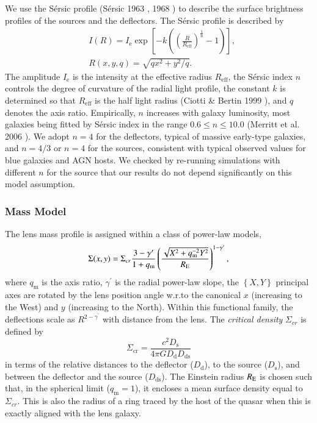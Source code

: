 \documentclass[a4paper,11pt]{article}
\def\qm{q_\mathrm{m}}
\begin{document}
We use the S\'ersic profile (S{\'e}rsic 1963 \cite{1963BAAA....6...41S}, 1968 \cite{1968adga.book.....S})
to describe the surface brightness profiles of the sources and the deflectors. The
S\'ersic profile is described by %
%
\begin{eqnarray}
   \label{eq:Intensity}
   &I(R) = I_{\mathrm{e}} \exp\left[-k\left(\left(\frac{R}{R_{\mathrm{eff}}}\right)^{\frac{1}{\mathrm{n}}}-1\right)\right] ,\\
   &R(x,y,q) = \sqrt{qx^2+y^2/q}.
\end{eqnarray}
%
The amplitude $I_{\mathrm{e}}$ is the intensity at the effective
radius $R_{\mathrm{eff}}$, the S\'ersic index $n$ controls the degree
of curvature of the radial light profile, the constant $k$ is determined so that
$R_{\mathrm{eff}}$ is the half light radius (Ciotti \& Bertin 1999 \cite{1999A&A...352..447C}),
 and $q$ denotes the axis ratio. Empirically, $n$ increases with galaxy luminosity, most
galaxies being fitted by S\'ersic index in the range $0.6 \le n
\le 10.0$ (Merritt et al. 2006 \cite{2006AJ....132.2685M}). We adopt $n=4$ for the
deflectors, typical of massive early-type galaxies, and $n=4/3$ or
$n=4$ for the sources, consistent with typical observed values for
blue galaxies and AGN hosts. We checked by re-running simulations with
different $n$ for the source that our results do not depend
significantly on this model assumption.

\subsubsection{Mass Model}

The lens mass profile is assigned within a class of power-law models,
%
\begin{equation}
\Sigma(x,y)=\Sigma_{cr}\frac{3-\gamma^{\prime}}{1+\qm}\left(\frac{\sqrt{ X^{2}+\qm^{-2}Y^{2}}}{R_{\rm E}}\right)^{1-\gamma^{\prime}},
\end{equation}
%
where $q_\mathrm{m}$ is the axis ratio, $\gamma^{\prime}$ is the
radial power-law slope, the $\left\{X,Y\right\}$ principal axes are
rotated by the lens position angle w.r.to the canonical $x$
(increasing to the West) and $y$ (increasing to the North).  Within
this functional family, the deflections scale as
$R^{2-\gamma^{\prime}}$ with distance from the lens.  The
\textit{critical density} $\Sigma_{cr}$ is defined by
%
\begin{equation}
\Sigma_{\mathrm{cr}} = \frac{c^{2}D_{\mathrm{s}}}{4\pi G D_{\mathrm{d}} D_{\mathrm{ds}}}
\end{equation}
%
in terms of the relative distances to the deflector ($D_{\mathrm{d}}$), to the
source ($D_{\mathrm{s}}$), and between the deflector and the source
($D_{\mathrm{ds}}$). The Einstein radius $R_{\rm{E}}$ is chosen such that, in the spherical limit ($\qm=1$),
 it encloses a mean surface density equal to $\Sigma_{cr}.$ This is also the radius of a ring traced by the host of
 the quasar when this is exactly aligned with the lens galaxy.
\end{document}
